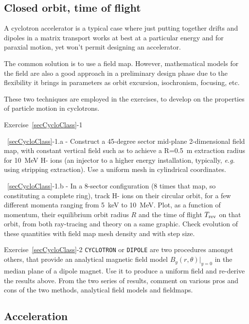 \subsection{Closed orbit, time of flight \label{secCycloClassTra}}

A cyclotron accelerator is a typical case 
where just putting together drifts and dipoles in a matrix transport works at best 
at a particular energy and for paraxial motion, yet won't permit designing an accelerator. 

The common solution is to use a field map. However, mathematical models for the field 
are also a good approach in a preliminary design phase due to the flexibility it brings 
in parameters as orbit excursion, isochronism, focusing, etc.

These two techniques are employed  in the exercises, to develop on the properties of particle motion 
in cyclotrons. 

\smallskip
\noindent {\small $\bullet$} Exercise~\ref{secCycloClass}-1 

\noindent ~\ref{secCycloClass}-1.a - 
Construct a 45-degree sector mid-plane 2-dimensional field map, with constant vertical field such as to 
achieve a R=0.5~m extraction radius for  10~MeV H- ions (an injector to a higher energy installation, 
typically, \textsl{e.g.} using stripping extraction). 
Use a uniform mesh in cylindrical coordinates. 

\noindent ~\ref{secCycloClass}-1.b - 
In a 8-sector configuration (8 times that map, so constituting a complete ring), 
track H- ions on their circular orbit, for a few different momenta ranging from 5~keV to 10~MeV.
 Plot, as a function of momentum, their 
equilibrium orbit radius $R$ and the time of flight $T_{\rm rev}$ on that orbit, 
 from both ray-tracing and  theory on a same graphic. 
Check evolution of these quantities with field map mesh density and with step size.



\smallskip
\noindent {\small $\bullet$} Exercise~\ref{secCycloClass}-2 
 \verb|CYCLOTRON| or \verb|DIPOLE| are two procedures amongst others, that provide an analytical 
 magnetic field model ${B_y(r,\theta)|_{y=0}}$ in the median plane of a dipole magnet. 
Use it to produce a uniform field and re-derive the results above. 
From the two series of results, comment on various pros and cons of the two methods, analytical field models and 
fieldmaps.


\subsection{Acceleration}\label{secCycloAccel}


